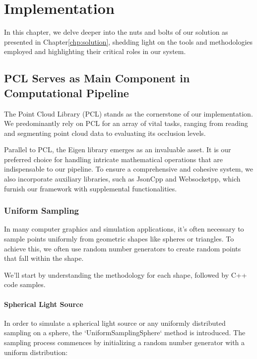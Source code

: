 \documentclass[11pt, a4paper,oneside,chapterprefix=false]{scrbook}
\begin{document}
\chapter{Implementation}\label{chp:implementation}

In this chapter, we delve deeper into the nuts and bolts of our solution as presented in Chapter\ref{chp:solution}, shedding light on the tools and methodologies employed and highlighting their critical roles in our system.

\section{PCL Serves as Main Component in Computational Pipeline}\label{sec:pcl and eigen}

The Point Cloud Library (PCL) stands as the cornerstone of our implementation. We predominantly rely on PCL for an array of vital tasks, ranging from reading and segmenting point cloud data to evaluating its occlusion levels.

Parallel to PCL, the Eigen library emerges as an invaluable asset. It is our preferred choice for handling intricate mathematical operations that are indispensable to our pipeline. To ensure a comprehensive and cohesive system, we also incorporate auxiliary libraries, such as JsonCpp and Websocketpp, which furnish our framework with supplemental functionalities.

\subsection{Uniform Sampling}\label{subsec:uniform sampling}

In many computer graphics and simulation applications, it's often necessary to sample points uniformly from geometric shapes like spheres or triangles. To achieve this, we often use random number generators to create random points that fall within the shape.

We'll start by understanding the methodology for each shape, followed by C++ code samples.

\subsubsection{Spherical Light Source}

In order to simulate a spherical light source or any uniformly distributed sampling on a sphere, the `UniformSamplingSphere` method is introduced. The sampling process commences by initializing a random number generator with a uniform distribution:
\end{document}
